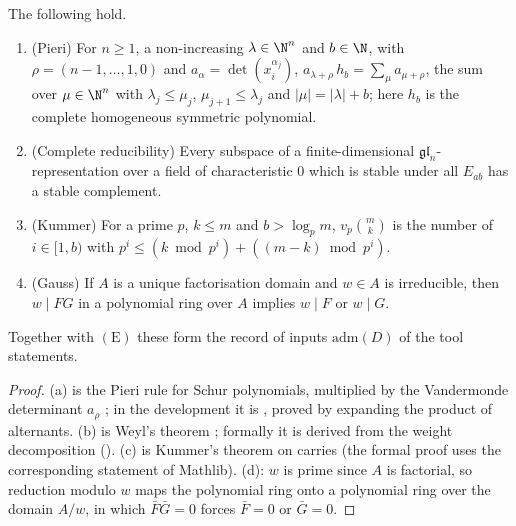 \begin{lemma}\label{pf:sh-curv:admitted}
The following hold.
\begin{enumerate}[label=(\alph*)]
\item (Pieri) For $n\ge1$, a non-increasing $\lambda\in\N^n$ and $b\in\N$, with $\rho=(n-1,\dots,1,0)$ and
$a_\alpha=\det(x_i^{\alpha_j})$,
$a_{\lambda+\rho}\,h_b=\sum_\mu a_{\mu+\rho}$, the sum over $\mu\in\N^n$ with $\lambda_j\le\mu_j$,
$\mu_{j+1}\le\lambda_j$ and $|\mu|=|\lambda|+b$; here $h_b$ is the complete homogeneous symmetric polynomial.
\item (Complete reducibility) Every subspace of a finite-dimensional $\mathfrak{gl}_n$-representation over a field of
characteristic $0$ which is stable under all $E_{ab}$ has a stable complement.
\item (Kummer) For a prime $p$, $k\le m$ and $b>\log_pm$, $v_p\binom mk$ is the number of $i\in[1,b)$ with $p^i\le(k\bmod
p^i)+((m-k)\bmod p^i)$.
\item (Gauss) If $A$ is a unique factorisation domain and $w\in A$ is irreducible, then $w\mid FG$ in a polynomial ring
over $A$ implies $w\mid F$ or $w\mid G$.
\end{enumerate}
Together with $(\mathrm E)$ these form the record of inputs $\mathrm{adm}(D)$ of the tool statements.
\end{lemma}

\begin{proof}
(a) is the Pieri rule for Schur polynomials, multiplied by the Vandermonde determinant $a_\rho$
\cite[I.(5.16)]{Macdonald1995}; in the development it is
, proved by expanding the product of
alternants. (b) is
Weyl's theorem \cite[\S9.3]{FultonHarris1991}; formally it is derived from the weight decomposition
(). (c) is Kummer's theorem on carries (the formal proof uses the
corresponding statement of Mathlib). (d): $w$ is prime since $A$ is factorial, so reduction modulo $w$ maps the polynomial
ring onto a polynomial ring over the domain $A/w$, in which $\bar F\bar G=0$ forces $\bar F=0$ or $\bar G=0$.
\end{proof}

